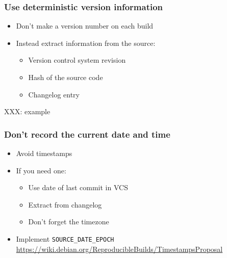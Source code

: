 \documentclass[14pt,ignorenonframetext]{beamer}
\begin{document}
\begin{frame}
 \frametitle{Use deterministic version information}

 \begin{itemize}
  \item Don't make a version number on each build
  \item<2> Instead extract information from the source:
    \begin{itemize}
      \item Version control system revision
      \item Hash of the source code
      \item Changelog entry
    \end{itemize}
 \end{itemize}

 XXX: example
\end{frame}

\begin{frame}
 \frametitle{Don't record the current date and time}

 \begin{itemize}
  \item Avoid timestamps
  \item<2-> If you need one:
    \begin{itemize}
      \item Use date of last commit in VCS
      \item Extract from changelog
      \item<3-> \alert{Don't forget the timezone}
    \end{itemize}
  \item<4> Implement \texttt{SOURCE\_DATE\_EPOCH} \\
    \url{https://wiki.debian.org/ReproducibleBuilds/TimestampsProposal}
 \end{itemize}
\end{frame}
\end{document}
